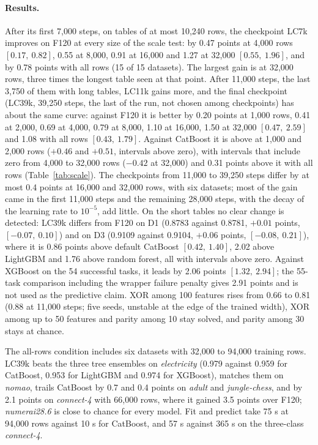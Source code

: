 \documentclass[11pt]{article}
\begin{document}
\paragraph{Results.} After its first 7,000 steps, on tables of at most 10,240 rows, the
checkpoint LC7k improves on F120 at every size of the scale test: by 0.47 points at 4,000 rows
$[0.17,\ 0.82]$, 0.55 at 8,000, 0.91 at 16,000 and 1.27 at 32,000 $[0.55,\ 1.96]$, and by 0.78 points
with all rows (15 of 15 datasets). The largest gain is at 32,000 rows, three times the longest table seen
at that point. After 11,000 steps, the last 3,750 of them with long tables, LC11k gains more, and the
final checkpoint (LC39k, 39,250 steps, the last of the run, not chosen among checkpoints) has about the
same curve: against F120 it is better by 0.20 points at 1,000 rows, 0.41 at 2,000, 0.69 at 4,000, 0.79
at 8,000, 1.10 at 16,000, 1.50 at 32,000 $[0.47,\ 2.59]$ and 1.08 with all rows $[0.43,\ 1.79]$. Against
CatBoost it is above at 1,000 and 2,000 rows ($+0.46$ and $+0.51$, intervals above zero), with intervals
that include zero from 4,000 to 32,000 rows ($-0.42$ at 32,000) and 0.31 points above it with all rows
(Table~\ref{tab:scale}). The checkpoints from 11,000 to 39,250 steps differ by at most 0.4 points
at 16,000 and 32,000 rows, with six datasets; most of the gain came in the first 11,000 steps and the
remaining 28,000 steps, with the decay of the learning rate to $10^{-5}$, add little. On the short tables
no clear change is detected: LC39k differs from F120 on D1 (0.8783 against 0.8781, $+0.01$ points, $[-0.07,\ 0.10]$) and
on D3 (0.9109 against 0.9104, $+0.06$ points, $[-0.08,\ 0.21]$), where it is 0.86 points above default
CatBoost $[0.42,\ 1.40]$, 2.02 above LightGBM and 1.76 above random forest, all with intervals above zero.
Against XGBoost on the 54 successful tasks, it leads by 2.06 points $[1.32,\ 2.94]$; the 55-task comparison
including the wrapper failure penalty gives 2.91 points and is not used as the predictive claim.
XOR among 100 features rises from 0.66 to 0.81 (0.88 at 11,000 steps; five seeds,
unstable at the edge of the trained width), XOR among up to 50 features and parity among 10 stay solved,
and parity among 30 stays at chance.

The all-rows condition includes six datasets with 32,000 to 94,000 training rows. LC39k beats the three
tree ensembles on \emph{electricity} (0.979 against 0.959 for CatBoost, 0.953 for LightGBM and 0.974 for
XGBoost), matches them on \emph{nomao}, trails CatBoost by 0.7 and 0.4 points on \emph{adult} and
\emph{jungle-chess}, and by 2.1 points on \emph{connect-4} with 66,000 rows, where it gained 3.5 points
over F120; \emph{numerai28.6} is close to chance for every model. Fit and predict take 75 s at 94,000
rows against 10 s for CatBoost, and 57 s against 365 s on the three-class \emph{connect-4}.
\end{document}
